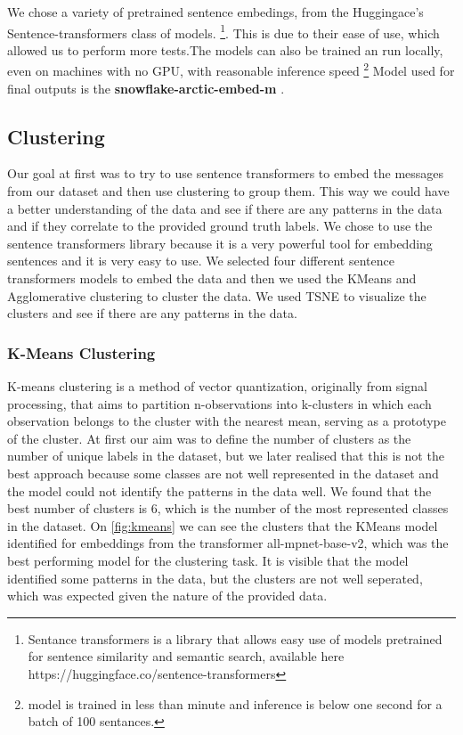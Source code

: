 \documentclass[fleqn,moreauthors,10pt]{ds_report}
\begin{document}
We chose a variety of pretrained sentence embedings, from the Huggingace's Sentence-transformers class of models.
\footnote{Sentance transformers is a library that allows easy use of models pretrained for sentence similarity and semantic search, available here https://huggingface.co/sentence-transformers}.
This is due to their ease of use, which allowed us to perform more tests.The models can also be trained an run locally, even on machines with no GPU, with reasonable inference speed \footnote{model is trained in less than  minute and inference is below one second for a batch of 100 sentances.}
Model used for final outputs is the \textbf{snowflake-arctic-embed-m} \cite{merrick2024arcticembed}.

\subsection{Clustering}
Our goal at first was to try to use sentence transformers to embed the messages from our dataset and then use clustering to group them.
This way we could have a better understanding of the data and see if there are any patterns in the data and if they correlate to the provided ground truth labels.
We chose to use the sentence transformers library because it is a very powerful tool for embedding sentences and it is very easy to use.
We selected four different sentence transformers models to embed the data and then we used the KMeans and Agglomerative clustering to cluster the data.
We used TSNE to visualize the clusters and see if there are any patterns in the data.

\subsubsection{K-Means Clustering}
K-means clustering is a method of vector quantization, originally from signal processing, that aims to partition n-observations into k-clusters in which each observation belongs to the cluster with the nearest mean, serving as a prototype of the cluster.
At first our aim was to define the number of clusters as the number of unique labels in the dataset, but we later realised that this is not the best approach because some classes are not well represented in the dataset and the model could not identify the patterns in the data well.
We found that the best number of clusters is 6, which is the number of the most represented classes in the dataset.
On \ref{fig:kmeans} we can see the clusters that the KMeans model identified for embeddings from the transformer all-mpnet-base-v2, 
which was the best performing model for the clustering task. It is visible that the model identified some patterns in the data, but the clusters are not well seperated, 
which was expected given the nature of the provided data.
\end{document}

